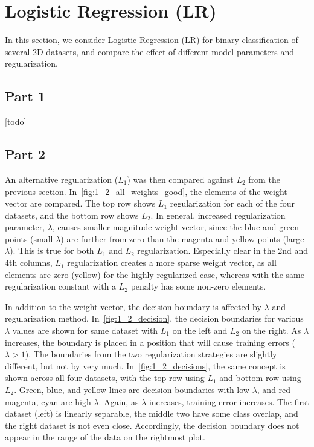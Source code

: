 \section{Logistic Regression (LR)} \label{sec:prob1}
In this section, we consider Logistic Regression (LR) for binary classification of several 2D datasets, and compare the effect of different model parameters and regularization.

\subsection{Part 1}
[todo]




\subsection{Part 2}
An alternative regularization ($L_1$) was then compared against $L_2$ from the previous section.
In~\cref{fig:1_2_all_weights_good}, the elements of the weight vector are compared.
The top row shows $L_1$ regularization for each of the four datasets, and the bottom row shows $L_2$.
In general, increased regularization parameter, $\lambda$, causes smaller magnitude weight vector, since the blue and green points (small $\lambda$) are further from zero than the magenta and yellow points (large $\lambda$).
This is true for both $L_1$ and $L_2$ regularization.
Especially clear in the 2nd and 4th columns, $L_1$ regularization creates a more sparse weight vector, as all elements are zero (yellow) for the highly regularized case, whereas with the same regularization constant with a $L_2$ penalty has some non-zero elements.

In addition to the weight vector, the decision boundary is affected by $\lambda$ and regularization method.
In~\cref{fig:1_2_decision}, the decision boundaries for various $\lambda$ values are shown for same dataset with $L_1$ on the left and $L_2$ on the right.
As $\lambda$ increases, the boundary is placed in a position that will cause training errors ($\lambda > 1$).
The boundaries from the two regularization strategies are slightly different, but not by very much.
In~\cref{fig:1_2_decisions}, the same concept is shown across all four datasets, with the top row using $L_1$ and bottom row using $L_2$.
Green, blue, and yellow lines are decision boundaries with low $\lambda$, and red magenta, cyan are high $\lambda$.
Again, as $\lambda$ increases, training error increases. The first dataset (left) is linearly separable, the middle two have some class overlap, and the right dataset is not even close.
Accordingly, the decision boundary does not appear in the range of the data on the rightmost plot.

